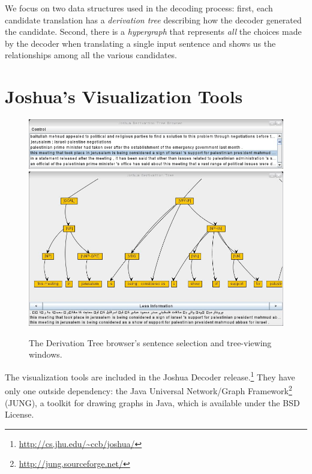 \documentclass[logo]{pbml}
\begin{document}
We focus on two data structures
used in the decoding process: first, each candidate translation has a {\em
derivation tree} describing how the decoder generated the candidate. Second,
there is a {\em hypergraph} that represents {\em all} the choices made by the
decoder when translating a single input sentence and shows us the relationships among all the various candidates.


\section{Joshua's Visualization Tools}


\begin{figure}
\includegraphics[width=.95\linewidth]{images/pick-window-2} 
\includegraphics[width=\linewidth]{images/urdu-tree-window-2}
\caption{The Derivation Tree browser's sentence selection and tree-viewing windows.}
\label{derivation-figure}
\end{figure}




The visualization tools are included in the Joshua Decoder release.\footnote{\url{http://cs.jhu.edu/~ccb/joshua/}} They have
only one outside dependency: the Java Universal Network/Graph Framework\footnote{\url{http://jung.sourceforge.net/}} (JUNG), a toolkit for drawing graphs in Java,
which is available under the BSD License.
\end{document}
